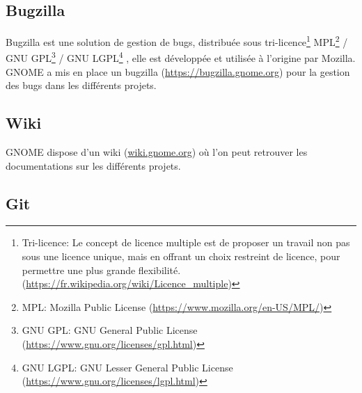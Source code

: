 \documentclass[12pt]{report}
\begin{document}
\subsection{Bugzilla}
\label{bugzilla}
Bugzilla est une solution de gestion de bugs, distribuée sous
tri-licence\footnote{Tri-licence: Le concept de licence multiple
  est de proposer un travail non pas sous une licence unique, mais
  en offrant un choix restreint de licence, pour permettre une plus
  grande flexibilité. 
  (\url{https://fr.wikipedia.org/wiki/Licence_multiple})}
MPL\footnote{MPL: Mozilla Public License 
  (\url{https://www.mozilla.org/en-US/MPL/})}
/ GNU GPL\footnote{GNU GPL: GNU General Public License 
  (\url{https://www.gnu.org/licenses/gpl.html})}
/ GNU LGPL\footnote{GNU LGPL: GNU Lesser General Public License 
  (\url{https://www.gnu.org/licenses/lgpl.html})}
, elle est développée et utilisée à l'origine par Mozilla.
GNOME a mis en place un bugzilla (\url{https://bugzilla.gnome.org}) pour 
la gestion des bugs dans les différents projets.


\subsection{Wiki}
\label{wiki}
GNOME dispose d'un wiki (\href{https://wiki.gnome.org/}{wiki.gnome.org})
où l'on peut retrouver les documentations sur les différents projets.

\subsection{Git}
\label{git}
\end{document}
